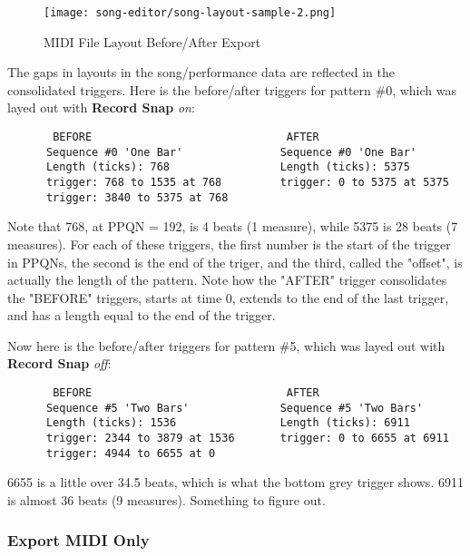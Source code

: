 \begin{figure}[H]
   \centering 
   \texttt{[image: song-editor/song-layout-sample-2.png]}
   \caption{MIDI File Layout Before/After Export}
   \label{fig:midi_export_file_before_after}
\end{figure}
   
   The gaps in layouts in the song/performance data are reflected in the
   consolidated triggers.
   Here is the before/after triggers for pattern \#0, which was
   layed out with \textbf{Record Snap} \textsl{on}:

   \begin{verbatim}
       BEFORE                              AFTER
      Sequence #0 'One Bar'               Sequence #0 'One Bar'
      Length (ticks): 768                 Length (ticks): 5375
      trigger: 768 to 1535 at 768         trigger: 0 to 5375 at 5375
      trigger: 3840 to 5375 at 768        
   \end{verbatim}

   Note that 768, at PPQN = 192, is 4 beats (1 measure), while 5375 is 28
   beats (7 measures).
   For each of these triggers, the first number is the start of the trigger in
   PPQNs, the second is the end of the triger, and the third, called the
   "offset", is actually the length of the pattern.
   Note how the "AFTER"
   trigger consolidates the "BEFORE" triggers, starts at time 0, extends to
   the end of the last trigger, and has a length equal to the end of the
   trigger.

   Now here is the before/after triggers for pattern \#5, which was
   layed out with \textbf{Record Snap} \textsl{off}:

   \begin{verbatim}
       BEFORE                              AFTER
      Sequence #5 'Two Bars'              Sequence #5 'Two Bars'
      Length (ticks): 1536                Length (ticks): 6911
      trigger: 2344 to 3879 at 1536       trigger: 0 to 6655 at 6911
      trigger: 4944 to 6655 at 0
   \end{verbatim}

   6655 is a little over 34.5 beats, which is what the bottom grey trigger
   shows.
   6911 is almost 36 beats (9 measures).  Something to figure out.

\subsubsection{Export MIDI Only}
\label{subsubsec:midi_export_file_export_midi_only}

